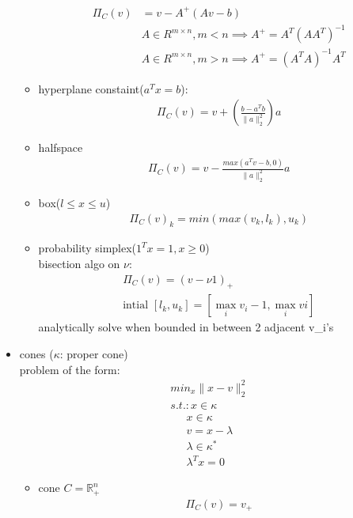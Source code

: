 \documentclass[8pt,letter]{article}
\newcommand{\R}{\mathbb{R}}
\begin{document}
\begin{multicols*}{2}
\begin{itemize}
\begin{itemize}
      \begin{align*}
        \Pi_C(v) &= v - A^{+}(Av-b)\\
                 &A \in R^{m \times n}, m < n \implies A^{+} = A^T(AA^T)^{-1}\\
                 &A \in R^{m \times n}, m > n \implies A^{+} = (A^TA)^{-1}A^T
      \end{align*}
    \item hyperplane constaint($a^Tx=b$):
      \begin{align*}
        \Pi_C(v) = v + (\frac{b-a^Tb}{\|a\|_2^2})a
      \end{align*}
    \item halfspace
      \begin{align*}
        \Pi_C(v) = v - \frac{max(a^T v -b,0)}{\|a\|_2^2}a
      \end{align*}
    \item box($l\leq x \leq u$)
      \begin{align*}
        \Pi_C(v)_k = min(max(v_k, l_k), u_k)
      \end{align*}
    \item probability simplex($1^Tx= 1, x \geq 0$)\\
      bisection algo on $\nu$:
      \begin{align*}
        \Pi_C(v) = (v- \nu 1)_+\\
        \text{intial }[l_k,u_k] = [\max_i v_i-1, \max_i vi]
      \end{align*}
      analytically solve when bounded in between 2 adjacent v_i's      
    \end{itemize}
  \item cones ($\kappa$: proper cone)\\
    problem of the form:
    \begin{align*}
      min_x \|x-v\|_2^2\\
      s.t.: x\in \kappa
    \end{align*}
    \begin{align*}
      x \in \kappa\\
      v=x-\lambda\\
      \lambda\in\kappa^*\\
      \lambda^Tx=0
    \end{align*}
    \begin{itemize}
    \item cone $C=\R_+^n$
      \begin{align*}
        \Pi_C(v)=v_+
      \end{align*}

\end{itemize}
\end{itemize}
\end{multicols*}
\end{document}
